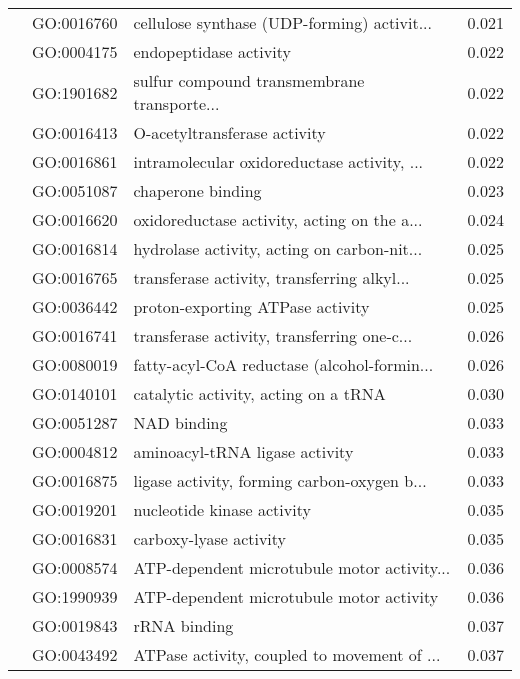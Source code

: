 \begin{longtable}{lllr}
   & GO:0016760 &  cellulose synthase (UDP-forming) activit... &         0.021 \\
   & GO:0004175 &                       endopeptidase activity &         0.022 \\
   & GO:1901682 &  sulfur compound transmembrane transporte... &         0.022 \\
   & GO:0016413 &                 O-acetyltransferase activity &         0.022 \\
   & GO:0016861 &  intramolecular oxidoreductase activity, ... &         0.022 \\
   & GO:0051087 &                            chaperone binding &         0.023 \\
   & GO:0016620 &  oxidoreductase activity, acting on the a... &         0.024 \\
   & GO:0016814 &  hydrolase activity, acting on carbon-nit... &         0.025 \\
   & GO:0016765 &  transferase activity, transferring alkyl... &         0.025 \\
   & GO:0036442 &             proton-exporting ATPase activity &         0.025 \\
   & GO:0016741 &  transferase activity, transferring one-c... &         0.026 \\
   & GO:0080019 &  fatty-acyl-CoA reductase (alcohol-formin... &         0.026 \\
   & GO:0140101 &         catalytic activity, acting on a tRNA &         0.030 \\
   & GO:0051287 &                                  NAD binding &         0.033 \\
   & GO:0004812 &               aminoacyl-tRNA ligase activity &         0.033 \\
   & GO:0016875 &  ligase activity, forming carbon-oxygen b... &         0.033 \\
   & GO:0019201 &                   nucleotide kinase activity &         0.035 \\
   & GO:0016831 &                       carboxy-lyase activity &         0.035 \\
   & GO:0008574 &  ATP-dependent microtubule motor activity... &         0.036 \\
   & GO:1990939 &     ATP-dependent microtubule motor activity &         0.036 \\
   & GO:0019843 &                                 rRNA binding &         0.037 \\
   & GO:0043492 &  ATPase activity, coupled to movement of ... &         0.037 \\

\end{longtable}
